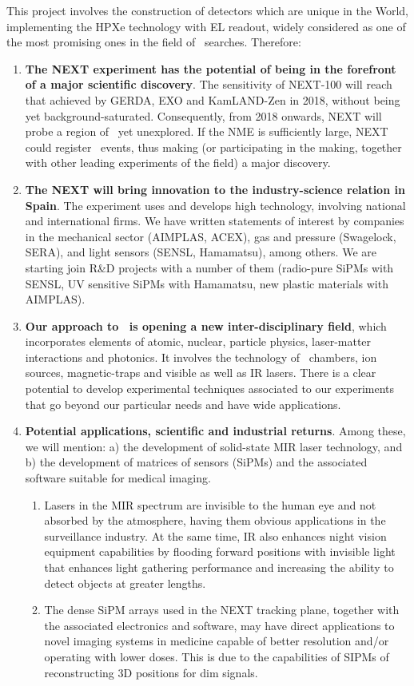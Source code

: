 This project involves the construction of detectors which are unique in the World, implementing the HPXe technology with EL readout, widely considered as one of the most promising ones in the field of \bbonu\ searches. Therefore: 
\begin{enumerate}
\item {\bf The NEXT experiment has the potential of being in the forefront of a major scientific discovery}. The sensitivity of NEXT-100 will reach that achieved by GERDA, EXO and KamLAND-Zen in 2018, without being yet background-saturated. Consequently, from 2018 onwards, NEXT will probe a region of \mbb\ yet unexplored. If the NME is sufficiently large, NEXT could register \bbonu\ events, thus making (or participating in the making, together with other leading experiments of the field) a major discovery.
\item {\bf The NEXT will bring innovation to the industry-science relation in Spain}. The experiment uses and develops high technology, involving national and international firms. We have written statements of interest by companies in the mechanical sector (AIMPLAS, ACEX), gas and pressure (Swagelock, SERA), and light sensors (SENSL, Hamamatsu), among others. We are starting join R\&D  projects with a number of them (radio-pure SiPMs with SENSL, UV sensitive SiPMs with Hamamatsu, new plastic materials with AIMPLAS).  
\item {\bf Our approach to \BATA\ is opening a new inter-disciplinary field}, which incorporates elements of atomic, nuclear, particle physics, laser-matter interactions and photonics. It involves the technology of \HPXE\ chambers, ion sources, magnetic-traps and visible as well as IR lasers. There is a clear potential to develop experimental techniques associated to our experiments that go beyond our particular needs and have wide applications.
\item {\bf Potential applications, scientific and industrial returns}. Among these, we will mention: a) the development of solid-state MIR laser technology, and b) the development of matrices of sensors (SiPMs) and the associated software suitable for medical imaging. 
\begin{enumerate}
\item Lasers in the MIR spectrum are invisible to the human eye and not absorbed by the atmosphere, having them obvious applications in the surveillance industry. At the same time, IR also enhances night vision equipment capabilities by flooding forward positions with invisible light that enhances light gathering performance and increasing the ability to detect objects at greater lengths. 
\item The dense SiPM arrays used in the NEXT tracking plane, together with the associated electronics and software, may have direct applications to novel imaging systems in medicine capable of better resolution and/or operating with lower doses. This is due to the capabilities of SIPMs of reconstructing 3D positions for dim signals. 
\end{enumerate}
\end{enumerate}

